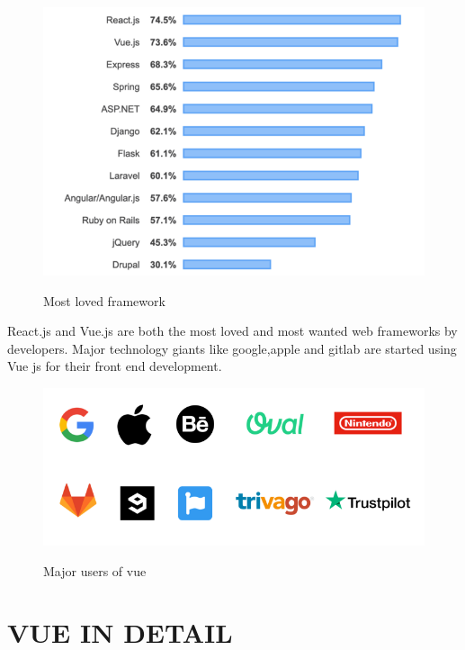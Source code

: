 \documentclass[12pt,a4paper,oneside]{report}
\begin{document}
\begin{figure}[H]
    \begin{center}
        \label{abc}
            \includegraphics[scale=.4]{vue1.png}
            \caption{ Most loved framework\cite{vue-stackoverflow}}
    \end{center}
\end{figure}
\par React.js and Vue.js are both the most loved and most wanted web frameworks by developers. Major technology giants like google,apple and gitlab are started using Vue js for their front end development.
\begin{figure}[H]
    \begin{center}
        \label{abc}
            \includegraphics[scale=.4]{vue2.png}
            \caption{ Major users of vue \cite{vue-users}}
    \end{center}
\end{figure}
\chapter{VUE IN DETAIL}
\end{document}

